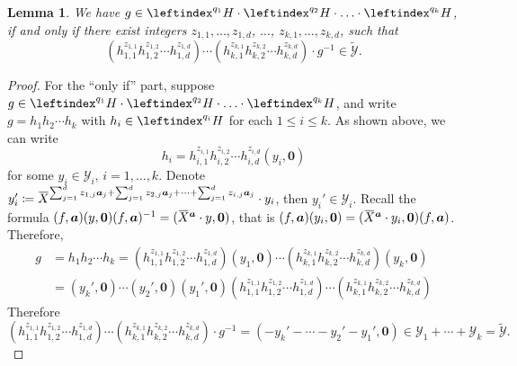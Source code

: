 \documentclass[a4paper,UKenglish,cleveref, autoref, thm-restate]{lipics-v2021}
\newcommand{\mY}{\mathcal{Y}}
\newcommand{\tY}{\widetilde{\mathcal{Y}}}
\newcommand{\ba}{\boldsymbol{a}}
\newcommand{\bzer}{\boldsymbol{0}}
\newcommand{\oX}{\mkern 1.5mu\overline{\mkern-1.5mu X \mkern-1.5mu}\mkern 1.5mu}
\newtheorem{lem}[thrm]{Lemma}
\theoremstyle{definition}
\theoremstyle{definition}
\theoremstyle{definition}
\begin{document}
\begin{lem}\label{lem:SMtoKP}
    We have $g \in \leftindex^{q_1}{H} \cdot \leftindex^{q_2}{H} \cdot \ldots \cdot \leftindex^{q_{k}}{H}$, if and only if there exist integers $z_{1, 1}, \ldots, z_{1, d}$, $\ldots$, $z_{k, 1}, \ldots, z_{k, d}$, such that
    \begin{equation}\label{eq:SMtoKP}
        \left(h_{1,1}^{z_{1, 1}} h_{1,2}^{z_{1, 2}} \cdots h_{1,d}^{z_{1, d}}\right) \cdots \left(h_{k,1}^{z_{k, 1}} h_{k,2}^{z_{k, 2}} \cdots h_{k,d}^{z_{k, d}}\right) \cdot g^{-1} \in \tY.
    \end{equation}
\end{lem}
\begin{proof}
    For the ``only if'' part, suppose $g \in \leftindex^{q_1}{H} \cdot \leftindex^{q_2}{H} \cdot \ldots \cdot \leftindex^{q_{k}}{H}$, and write $g = h_1 h_2 \cdots h_k$ with $h_i \in \leftindex^{q_i}{H}$ for each $1 \leq i \leq k$.
    As shown above, we can write
    \[
    h_i = h_{i,1}^{z_{i, 1}} h_{i,2}^{z_{i, 2}} \cdots h_{i,d}^{z_{i, d}} (y_i, \bzer)
    \]
    for some $y_i \in \mY_i, \, i = 1, \ldots, k$.
    Denote $y_i' \coloneqq \oX^{\sum_{j = 1}^d z_{1, j} \ba_j + \sum_{j = 1}^d z_{2, j} \ba_j + \cdots + \sum_{j = 1}^d z_{i, j} \ba_j} \cdot y_i$, then $y_i' \in \mY_i$.
    Recall the formula $(f, \ba)(y, \bzer)(f, \ba)^{-1} = (\oX^{\ba} \cdot y, \bzer)$, that is $(f, \ba)(y_i, \bzer) = (\oX^{\ba} \cdot y_i, \bzer) (f, \ba)$. Therefore,
    \begin{align*}
        g & = h_1 h_2 \cdots h_k 
        = \left(h_{1,1}^{z_{1, 1}} h_{1,2}^{z_{1, 2}} \cdots h_{1,d}^{z_{1, d}}\right) (y_1, \bzer) \cdots \left(h_{k,1}^{z_{k, 1}} h_{k,2}^{z_{k, 2}} \cdots h_{k,d}^{z_{k, d}}\right) (y_k, \bzer) \\
        & = (y_k', \bzer) \cdots (y_2', \bzer) (y_1', \bzer) \left(h_{1,1}^{z_{1, 1}} h_{1,2}^{z_{1, 2}} \cdots h_{1,d}^{z_{1, d}}\right) \cdots \left(h_{k,1}^{z_{k, 1}} h_{k,2}^{z_{k, 2}} \cdots h_{k,d}^{z_{k, d}}\right)
    \end{align*}
    Therefore 
    \[
    \left(h_{1,1}^{z_{1, 1}} h_{1,2}^{z_{1, 2}} \cdots h_{1,d}^{z_{1, d}}\right) \cdots \left(h_{k,1}^{z_{k, 1}} h_{k,2}^{z_{k, 2}} \cdots h_{k,d}^{z_{k, d}}\right) \cdot g^{-1} = (- y_k' - \cdots - y_2' - y_1', \bzer) \in \mY_1 + \cdots + \mY_k = \tY.
    \]


\end{proof}
\end{document}
